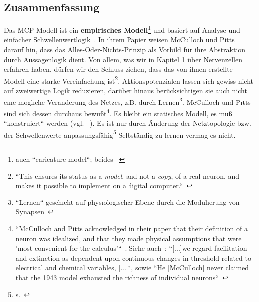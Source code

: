{\noindent{}


\clearpage
\pagebreak


\subsection{Zusammenfassung}\label{mcp-summary}

Das MCP-Modell ist ein \textbf{empirisches Modell}\footnote{
    auch ``caricature model``; beides ~\cite[4]{HI97}
} und basiert auf Analyse und einfacher Schwellenwertlogik~\cite[16]{AR88}.
In ihrem Papier weisen McCulloch und Pitts darauf hin, dass das Alles-Oder-Nichts-Prinzip als Vorbild für ihre Abstraktion durch Aussagenlogik dient.
Von allem, was wir in Kapitel 1 über Nervenzellen erfahren haben, dürfen wir den Schluss ziehen, dass das von ihnen erstellte Modell eine starke Vereinfachung ist\footnote{
    ``This ensures its status as a \textit{model}, and not a \textit{copy}, of a real neuron, and makes it possible to implement on a digital computer.``~\cite[43, Hervorhebungen i. O.]{BJ90}
}.
Aktionspotenzialen lassen sich gewiss nicht auf zweiwertige Logik reduzieren, darüber hinaus berücksichtigen sie auch nicht eine mögliche Veränderung des Netzes, z.B. durch Lernen\footnote{
    ``Lernen`` geschieht auf physiologischer Ebene durch die Modulierung von Synapsen~\cite[115]{HS19c}
}.
McCulloch und Pitts sind sich dessen durchaus bewußt\footnote{
    ``McCulloch and Pitts acknowledged in their paper that their definition of a neuron was idealized, and that they made physical assumptions that were 'most convenient for the calculus'``~\cite[21]{Abr02}. Siehe auch~\cite[101]{MP43}: ``[...]we regard facilitation and extinction as dependent upon continuous changes in threshold related to electrical and chemical variables, [...]``, sowie ``He {[McCulloch]} never claimed that the 1943 model exhausted the richness of individual neurons``~\cite[11]{Arb19}
}.
Es bleibt ein statisches Modell, es muß ``konstruiert`` werden (vgl. ~\cite[28]{Fau94}).
Es ist nur durch Änderung der Netztopologie bzw. der Schwellenwerte anpassungsfähig\footnote{s.~\cite[51]{Roj93}} Selbständig zu lernen vermag es nicht.\\


}
